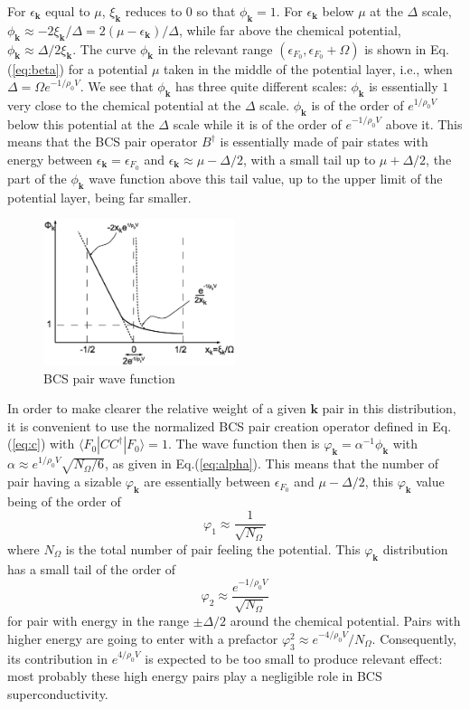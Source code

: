 \documentclass[aps,prb,preprint,groupedaddress,amsmath]{revtex4}
\newcommand{\vk}{\ensuremath{\mathbf{k}}}
\newcommand{\dg}{\ensuremath{\dagger}}
\begin{document}
For $\epsilon_\vk$ equal to $\mu$, $\xi_\vk$ reduces to $0$ so that $\phi_\vk=1$.  For $\epsilon_\vk$ below $\mu$ at the $\Delta$ scale, $\phi_\vk\approx-2\xi_\vk/\Delta=2(\mu-\epsilon_\vk)/\Delta $, while far above the chemical potential, $\phi_\vk\approx\Delta/2\xi_\vk$. The curve $\phi_\vk$ in the relevant range $(\epsilon_{F_0},\epsilon_{F_0}+\Omega)$ is shown in Eq.(\ref{eq:beta}) for a potential $\mu$ taken in the middle of the potential layer, i.e., when $\Delta=\Omega{}e^{-1/\rho_0V}$.  We see that $\phi_\vk$ has three quite different scales: $\phi_\vk$ is essentially $1$ very close to the chemical potential at the $\Delta$ scale. $\phi_\vk$ is of the order of $e^{1/\rho_0V}$ below this potential at the $\Delta$ scale while it is of the order of $e^{-1/\rho_0V}$ above it.  This means that the BCS pair operator $B^\dg$ is essentially made of pair states with energy between $\epsilon_\vk=\epsilon_{F_0}$ and $\epsilon_\vk\approx\mu-\Delta/2$, with a small tail up to  $\mu+\Delta/2$, the part of the $\phi_\vk$ wave function above this tail value, up to the upper limit of the potential layer, being far smaller. 
 \begin{figure}[htb]
 \includegraphics[width=0.5\textwidth]{BcsWF}
 \caption{BCS pair wave function\label{}}
 \end{figure}

In order to make clearer the relative weight of a given $\vk$ pair in this distribution, it is convenient to use the normalized BCS pair creation operator defined in Eq. (\ref{eq:c})
with $\langle{}F_0|CC^\dg|F_0\rangle=1$. The wave function then is $\varphi_\vk=\alpha^{-1}\phi_\vk$ with $\alpha\approx{}e^{1/\rho_0V}\sqrt{N_\Omega/6}$, as given in Eq.(\ref{eq:alpha}). This means that the number of pair having a sizable $\varphi_\vk$ are essentially between $\epsilon_{F_0}$ and  $\mu-\Delta/2$, this $\varphi_\vk$ value being of the order of 
\begin{equation}
 \varphi_1\approx\frac{1}{\sqrt{N_\Omega}}
\end{equation}
where $N_\Omega$ is the total number of pair feeling the potential.  This $\varphi_\vk$ distribution has a small tail of the order of 
\begin{equation}
  \varphi_2\approx\frac{e^{-1/\rho_0V}}{\sqrt{N_\Omega}}
\end{equation}
for pair with energy in the range $\pm\Delta/2$ around the chemical potential.  Pairs with higher energy are going to enter with a prefactor $\varphi_3^2\approx{}e^{-4/\rho_0V}/N_\Omega$. Consequently, its contribution in $e^{4/\rho_0V}$ is expected to be too small to produce relevant effect: most probably these high energy pairs play a negligible role in BCS superconductivity. 
\end{document}
